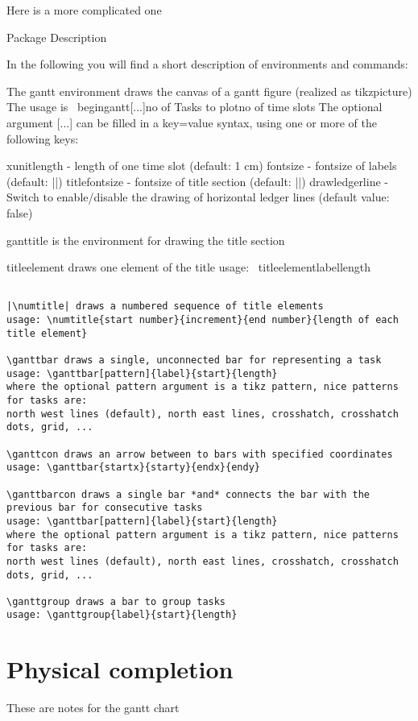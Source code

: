 Here is a more complicated one

   
Package Description

In the following you will find a short description of environments and commands: 

The gantt environment draws the canvas of a gantt figure (realized as tikzpicture)
The usage is \ begin{gantt}[...]{no of Tasks to plot}{no of time slots}
The optional argument [...] can be filled in a key=value syntax, using one or more of the following keys:

xunitlength - length of one time slot (default: 1 cm)
fontsize - fontsize of labels (default: |\normalsize|)
titlefontsize - fontsize of title section (default: |\small|)
drawledgerline - Switch to enable/disable the drawing of horizontal ledger lines (default value: false)

ganttitle is the environment for drawing the title section


{titleelement} draws one element of the title
usage: \ titleelement{label}{length}


\begin{verbatim}

|\numtitle| draws a numbered sequence of title elements
usage: \numtitle{start number}{increment}{end number}{length of each title element}

\ganttbar draws a single, unconnected bar for representing a task
usage: \ganttbar[pattern]{label}{start}{length}
where the optional pattern argument is a tikz pattern, nice patterns for tasks are: 
north west lines (default), north east lines, crosshatch, crosshatch dots, grid, ...

\ganttcon draws an arrow between to bars with specified coordinates
usage: \ganttbar{startx}{starty}{endx}{endy}

\ganttbarcon draws a single bar *and* connects the bar with the previous bar for consecutive tasks
usage: \ganttbar[pattern]{label}{start}{length}
where the optional pattern argument is a tikz pattern, nice patterns for tasks are: 
north west lines (default), north east lines, crosshatch, crosshatch dots, grid, ...

\ganttgroup draws a bar to group tasks
usage: \ganttgroup{label}{start}{length}
\end{verbatim}

\section{Physical completion}

\label{g:test}

These are notes for the gantt chart
